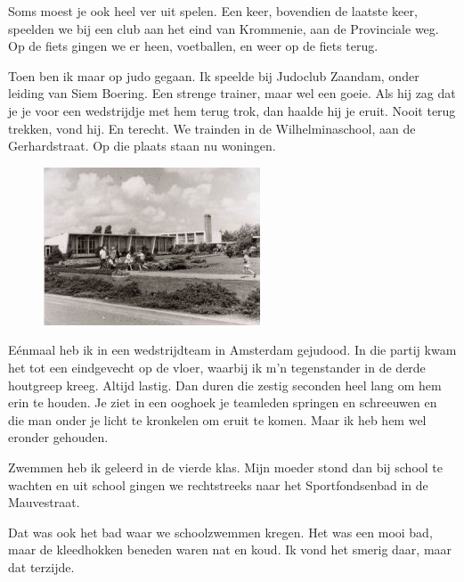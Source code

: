 \documentclass[12pt,twoside, openright]{memoir}
\begin{document}
Soms moest je ook heel ver uit spelen. Een keer, bovendien de laatste keer, speelden we bij een club aan het eind van Krommenie, aan de Provinciale weg. Op de fiets gingen we er heen, voetballen, en weer op de fiets terug. 

Toen ben ik maar op judo gegaan. Ik speelde bij Judoclub Zaandam, onder leiding van Siem Boering. Een strenge trainer, maar wel een goeie. Als hij zag dat je je voor een wedstrijdje met hem terug trok, dan haalde hij je eruit. Nooit terug trekken, vond hij. En terecht. We trainden in de Wilhelminaschool, aan de Gerhardstraat. Op die plaats staan nu woningen.

\begin{figure}
\includegraphics[width=\textwidth]{img/ch11/wilhelminaschool}
\end{figure}

Eénmaal heb ik in een wedstrijdteam in Amsterdam gejudood. In die partij kwam het tot een eindgevecht op de vloer, waarbij ik m’n tegenstander in de derde houtgreep kreeg. Altijd lastig. Dan duren die zestig seconden heel lang om hem erin te houden. Je ziet in een ooghoek je teamleden springen en schreeuwen en die man onder je licht te kronkelen om eruit te komen. Maar ik heb hem wel eronder gehouden. 

Zwemmen heb ik geleerd in de vierde klas. Mijn moeder stond dan bij school te wachten en uit school gingen we rechtstreeks naar het Sportfondsenbad in de Mauvestraat. 

Dat was ook het bad waar we schoolzwemmen kregen. Het was een mooi bad, maar de kleedhokken beneden waren nat en koud. Ik vond het smerig daar, maar dat terzijde. 
\end{document}
